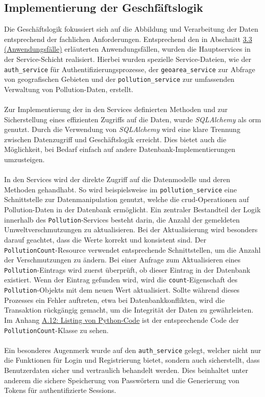 \documentclass[a4paper,12pt]{article}
\begin{document}
\subsection{Implementierung der Geschfäftslogik}
Die Geschäftslogik fokussiert sich auf die Abbildung und Verarbeitung der Daten entsprechend der fachlichen Anforderungen. Entsprechend den in Abschnitt \hyperref[sec:anwendungsfälle]{3.3 (Anwendungsfälle)} erläuterten Anwendungsfällen, wurden die Hauptservices in der Service-Schicht realisiert. Hierbei wurden spezielle Service-Dateien, wie der \texttt{auth\_service} für Authentifizierungsprozesse, der \texttt{geoarea\_service} zur Abfrage von geografischen Gebieten und der \texttt{pollution\_service} zur umfassenden Verwaltung von Pollution-Daten, erstellt.\\
\\
Zur Implementierung der in den Services definierten Methoden und zur Sicherstellung eines effizienten Zugriffs auf die Daten, wurde \textit{SQLAlchemy} als \acrshort{orm} genutzt. Durch die Verwendung von \textit{SQLAlchemy} wird eine klare Trennung zwischen Datenzugriff und Geschäftslogik erreicht. Dies bietet auch die Möglichkeit, bei Bedarf einfach auf andere Datenbank-Implementierungen umzusteigen.\\
\\
In den Services wird der direkte Zugriff auf die Datenmodelle und deren Methoden gehandhabt. So wird beispielsweise im \texttt{pollution\_service} eine Schnittstelle zur Datenmanipulation genutzt, welche die \acrshort{crud}-Operationen auf Pollution-Daten in der Datenbank ermöglicht. Ein zentraler Bestandteil der Logik innerhalb des \texttt{Pollution}-Services besteht darin, die Anzahl der gemeldeten Umweltverschmutzungen zu aktualisieren. Bei der Aktualisierung wird besonders darauf geachtet, dass die Werte korrekt und konsistent sind. Der \texttt{PollutionCount}-Resource verwendet entsprechende Schnittstellen, um die Anzahl der Verschmutzungen zu ändern. Bei einer Anfrage zum Aktualisieren eines \texttt{Pollution}-Eintrags wird zuerst überprüft, ob dieser Eintrag in der Datenbank existiert. Wenn der Eintrag gefunden wird, wird die \texttt{count}-Eigenschaft des \texttt{Pollution}-Objekts mit dem neuen Wert aktualisiert. Sollte während dieses Prozesses ein Fehler auftreten, etwa bei Datenbankkonflikten, wird die Transaktion rückgängig gemacht, um die Integrität der Daten zu gewährleisten. Im Anhang \hyperref[sec:pflichtenheft]{A.12: Listing von Python-Code} ist der entsprechende Code der \texttt{PollutionCount}-Klasse zu sehen.\\
\\
Ein besonderes Augenmerk wurde auf den \texttt{auth\_service} gelegt, welcher nicht nur die Funktionen für Login und Registrierung bietet, sondern auch sicherstellt, dass Benutzerdaten sicher und vertraulich behandelt werden. Dies beinhaltet unter anderem die sichere Speicherung von Passwörtern und die Generierung von Tokens für authentifizierte Sessions.
\end{document}
